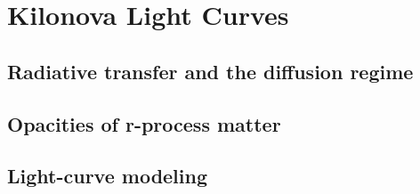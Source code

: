 

\chapter{Kilonova Light Curves}

\section{Radiative transfer and the diffusion regime}
\section{Opacities of r-process matter}
\section{Light-curve modeling}







